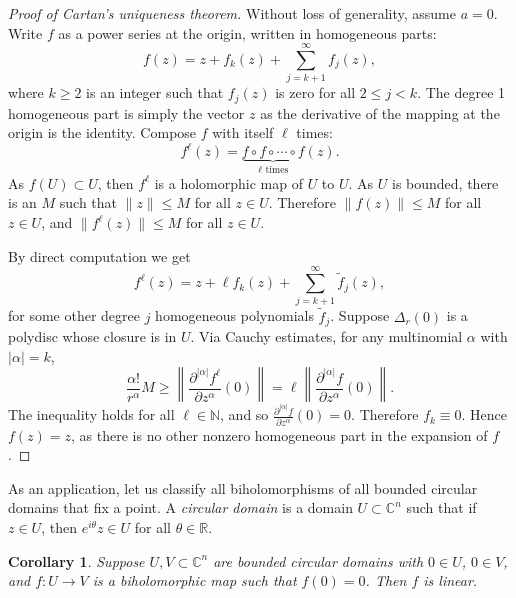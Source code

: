\documentclass[12pt,openany]{book}
\newcommand{\sabs}[1]{\lvert {#1} \rvert}
\newcommand{\snorm}[1]{\lVert {#1} \rVert}
\newcommand{\norm}[1]{\left\lVert {#1} \right\rVert}
\newcommand{\C}{{\mathbb{C}}}
\newcommand{\R}{{\mathbb{R}}}
\newcommand{\N}{{\mathbb{N}}}
\newcommand{\myindex}[1]{#1\index{#1}}
\theoremstyle{plain}
\newtheorem{cor}[thm]{Corollary}
\theoremstyle{remark}
\theoremstyle{definition}
\theoremstyle{exercise}
\theoremstyle{example}
\begin{document}
\begin{proof}[Proof of Cartan's uniqueness theorem]
Without loss of generality, assume $a=0$.  Write $f$ 
as a power series at the origin, written in homogeneous parts:
\begin{equation*}
f(z) = z + f_k(z) + \sum_{j=k+1}^\infty f_j(z) ,
\end{equation*}
where $k \geq 2$ is an integer such that $f_j(z)$ is zero for all
$2 \leq j < k$.  The degree 1 homogeneous part is simply the vector $z$
as the derivative of the mapping at the origin is the identity.
Compose $f$ with itself $\ell$ times:
\begin{equation*}
f^\ell(z) = \underbrace{f \circ f \circ \cdots \circ f}_{\ell\text{ times}}
(z) .
\end{equation*}
As $f(U) \subset U$, then $f^\ell$ is a holomorphic map
of $U$ to $U$.  As $U$ is bounded, there is an $M$ such that $\snorm{z} \leq
M$ for all $z \in U$.  Therefore $\snorm{f(z)} \leq M$ for all $z \in U$, and
$\snorm{f^\ell(z)} \leq M$ for all $z \in U$.

By direct computation we get
\begin{equation*}
f^\ell(z) = z + \ell f_k(z) + \sum_{j=k+1}^\infty \tilde{f}_j(z) ,
\end{equation*}
for some other degree $j$ homogeneous polynomials $\tilde{f}_j$.  Suppose $\Delta_r(0)$ is a polydisc whose
closure is in $U$.
Via Cauchy estimates,
for any multinomial $\alpha$ with $\sabs{\alpha}=k$,
\begin{equation*}
\frac{\alpha!}{r^\alpha} M
\geq
\norm{\frac{\partial^{\sabs{\alpha}} f^\ell}{\partial z^\alpha}(0)}
=
\ell
\norm{\frac{\partial^{\sabs{\alpha}} f}{\partial z^\alpha}(0)} .
\end{equation*}
The inequality holds for all $\ell \in \N$, and so
$\frac{\partial^{\sabs{\alpha}} f}{\partial z^\alpha}(0) = 0$.  Therefore
$f_k \equiv 0$.  Hence $f(z) = z$, as there is no other
nonzero homogeneous part in the expansion of $f$.
\end{proof}

As an application, let us classify all biholomorphisms of all bounded
circular domains that fix a point.
A \emph{\myindex{circular domain}} is a domain
$U \subset \C^n$ such that if $z \in U$, then $e^{i\theta} z \in U$ for
all $\theta \in \R$.

\begin{cor}
Suppose $U, V \subset \C^n$ are bounded circular domains with $0 \in U$, $0 \in
V$, and $f \colon U \to V$ is
a biholomorphic map such that $f(0) = 0$.  Then $f$ is linear.
\end{cor}
\end{document}
